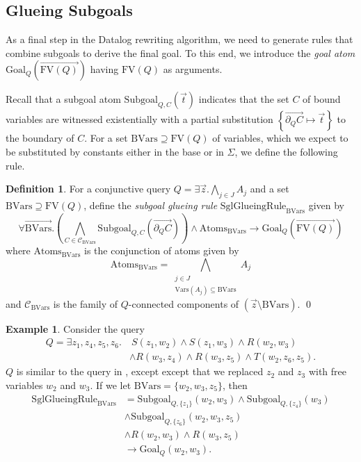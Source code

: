 \documentclass[12pt]{report}
\theoremstyle{plain}
\theoremstyle{definition}
\newtheorem{definition}[theorem]{Definition}
\newtheorem{example}[theorem]{Example}
\def\FV{{\mathrm{FV}}}
\def\Vars{{\mathrm{Vars}}}
\begin{document}
\subsection{Glueing Subgoals}
\label{glueing-subgoals}

As a final step in the Datalog rewriting algorithm, we need to generate rules that combine subgoals to derive the final goal. To this end, we introduce the \emph{goal atom} $\mathrm{Goal}_Q\left( \overrightarrow{\FV(Q)} \right)$ having $\FV(Q)$ as arguments.

Recall that a subgoal atom $\mathrm{Subgoal}_{Q, C}(\vec{t})$ indicates that the set $C$ of bound variables are witnessed existentially with a partial substitution $\left\{ \overrightarrow{\partial_Q C} \mapsto \vec{t} \right\}$ to the boundary of $C$. For a set $\mathrm{BVars} \supseteq \FV(Q)$ of variables, which we expect to be substituted by constants either in the base or in $\Sigma$, we define the following rule.

\begin{definition}
\label{subgoal-glueing-rule}
  For a conjunctive query $Q = \exists \vec{z}. \bigwedge_{j \in J} A_j$ and a set $\mathrm{BVars} \supseteq \FV(Q)$, define the \emph{subgoal glueing rule} $\mathrm{SglGlueingRule}_\mathrm{BVars}$ given by
  $$
    \forall \overrightarrow{\mathrm{BVars}}. \left(
      \bigwedge_{C \in \mathcal{C}_\mathrm{BVars}} \mathrm{Subgoal}_{Q, C}\left(\overrightarrow{\partial_Q C}\right)
    \right) \wedge \mathrm{Atoms}_\mathrm{BVars}
    \rightarrow \mathrm{Goal}_Q\left( \overrightarrow{\FV(Q)} \right)
  $$
  where $\mathrm{Atoms}_\mathrm{BVars}$ is the conjunction of atoms given by $$
    \mathrm{Atoms}_\mathrm{BVars} = \bigwedge_{\substack{j \in J \\ \Vars(A_j) \subseteq \mathrm{BVars}}} A_j
  $$ and $\mathcal{C}_\mathrm{BVars}$ is the family of $Q$-connected components of $(\vec{z} \setminus \mathrm{BVars})$.
  \qed
\end{definition}

\begin{example}
\label{example:glueing-rule}
  Consider the query
  \begin{align*}
    Q = \exists z_1,z_4,z_5,z_6.&\ S(z_1, w_2) \wedge S(z_1,w_3) \wedge R(w_2, w_3) \\
    &\wedge R(w_3, z_4) \wedge R(w_3, z_5) \wedge T(w_2, z_6, z_5).
  \end{align*}
  $Q$ is similar to the query in , except except that we replaced $z_2$ and $z_3$ with free variables $w_2$ and $w_3$. If we let $\mathrm{BVars} = \{w_2, w_3, z_5\}$, then \begin{align*}
    \mathrm{SglGlueingRule}_{\mathrm{BVars}}
      &= \mathrm{Subgoal}_{Q, \{z_1\}}(w_2, w_3) \wedge \mathrm{Subgoal}_{Q, \{z_4\}}(w_3) \\
      &\wedge \mathrm{Subgoal}_{Q, \{z_6\}}(w_2, w_3, z_5) \\
      &\wedge R(w_2, w_3) \wedge R(w_3, z_5) \\
      &\rightarrow \mathrm{Goal}_Q(w_2, w_3).
  \end{align*}
\end{example}
\end{document}

